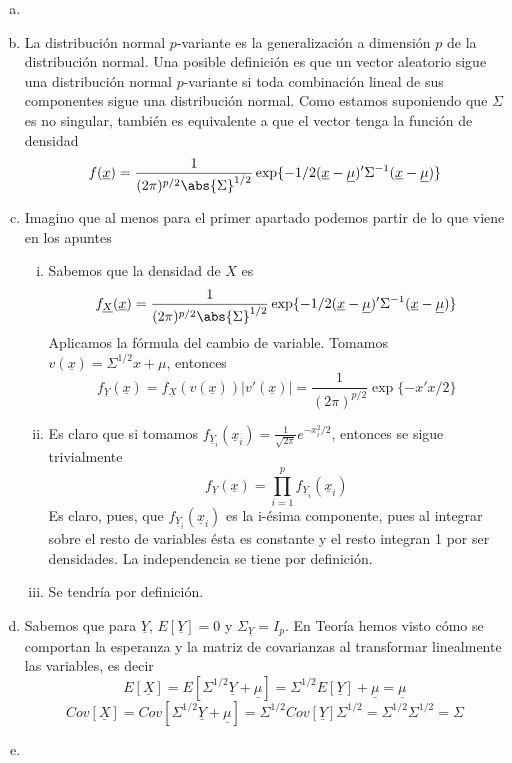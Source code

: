 \documentclass[twoside]{article}
\newcommand{\muestra}[1]{{\underline{#1}}}
\newcommand{\m}[1]{{\muestra{#1}}}
\begin{document}
\begin{solucion}
\begin{enumerate}[(a)]
\item[]
\item La distribución normal $p$-variante es la generalización a dimensión $p$ de la distribución normal. Una posible definición es que un vector aleatorio sigue una distribución normal $p$-variante si toda combinación lineal de sus componentes sigue una distribución normal. Como estamos suponiendo que $\Sigma$ es no singular, también es equivalente a que el vector tenga la función de densidad
$$
f(\muestra{x})=\frac{1}{(2\pi)^{p/2}\abs{\Sigma}^{1/2}}\exp\{-1/2(\muestra{x}-\muestra{\mu})'\Sigma^{-1}(\muestra{x}-\muestra{\mu})\}
$$
\item Imagino que al menos para el primer apartado podemos partir de lo que viene en los apuntes
\begin{enumerate}[i.]
\item Sabemos que la densidad de $X$ es
$$
f_\muestra{X}(\muestra{x})=\frac{1}{(2\pi)^{p/2}\abs{\Sigma}^{1/2}}\exp\{-1/2(\muestra{x}-\muestra{\mu})'\Sigma^{-1}(\muestra{x}-\muestra{\mu})\}
$$
Aplicamos la fórmula del cambio de variable. Tomamos $v(\muestra{x})=\Sigma^{1/2}x+\mu$, entonces
$$f_\muestra{Y}(\muestra{x})=f_\muestra{X}(v(\muestra{x}))|v'(\muestra{x})| = \frac{1}{(2\pi)^{p/2}}\exp\{-x'x/2\}
$$
\item Es claro que si tomamos $f_{\muestra{Y}_i}(\muestra{x}_i)= \frac{1}{\sqrt{2\pi}}e^{-x_i^2/2}$, entonces se sigue trivialmente
$$
f_\muestra{Y}(\muestra{x})=\prod_{i=1}^p f_{\muestra{Y}_i}(\muestra{x}_i)
$$
Es claro, pues, que $f_{\muestra{Y}_i}(\muestra{x}_i)$ es la i-ésima componente, pues al integrar sobre el resto de variables ésta es constante y el resto integran 1 por ser densidades. La independencia se tiene por definición.
\item Se tendría por definición.
\end{enumerate}
\item Sabemos que para $\muestra{Y}$, $E[\muestra{Y}]=0$ y $\Sigma_{\muestra{Y}}=I_p$. En Teoría hemos visto cómo se comportan la esperanza y la matriz de covarianzas al transformar linealmente las variables, es decir
$$
E[\muestra{X}]=E[\Sigma^{1/2}\muestra{Y}+\muestra{\mu}] = \Sigma^{1/2}E[\muestra{Y}]+\muestra{\mu}=\m{\mu}
$$
$$
Cov[\muestra{X}]=Cov[\Sigma^{1/2}\muestra{Y}+\muestra{\mu}] ={\Sigma^{1/2}}Cov[\m{Y}]\Sigma^{1/2}= {\Sigma^{1/2}}\Sigma^{1/2} =\Sigma
$$
\item 
\begin{enumerate}[i.]

\end{enumerate}
\end{enumerate}
\end{solucion}
\end{document}
